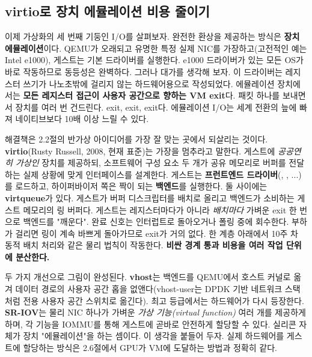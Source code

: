 \subsection*{virtio로 장치 에뮬레이션 비용 줄이기}

이제 가상화의 세 번째 기둥인 I/O를 살펴보자. 완전한 환상을 제공하는 방식은 \textbf{장치 에뮬레이션}이다. QEMU가 오래되고 유명한 특정 실제 NIC를 가장하고(고전적인 예는 Intel e1000), 게스트는 기본 드라이버를 실행한다. e1000 드라이버가 있는 모든 OS가 바로 작동하므로 동등성은 완벽하다. 그러나 대가를 생각해 보자. 이 드라이버는 레지스터 쓰기가 나노초밖에 걸리지 않는 하드웨어용으로 작성되었다. 에뮬레이션 장치에서는 \textbf{모든 레지스터 접근이 사용자 공간으로 향하는 VM exit}다. 패킷 하나를 보내면서 장치를 여러 번 건드린다. exit, exit, exit다. 에뮬레이션 I/O는 세계 전환의 늪에 빠져 네이티브보다 10배 이상 느릴 수 있다.

해결책은 2.2절의 반가상 아이디어를 가장 잘 맞는 곳에서 되살리는 것이다. \textbf{virtio}(Rusty Russell, 2008, 현재 표준)는 가장을 멈추라고 말한다. 게스트에 \textit{공공연히 가상인} 장치를 제공하되, 소프트웨어 구성 요소 두 개가 공유 메모리로 버퍼를 전달하는 실제 상황에 맞게 인터페이스를 설계한다. 게스트는 \textbf{프런트엔드 드라이버}(, , ...)를 로드하고, 하이퍼바이저 쪽은 짝이 되는 \textbf{백엔드}를 실행한다. 둘 사이에는 \textbf{virtqueue}가 있다. 게스트가 버퍼 디스크립터를 배치로 올리고 백엔드가 소비하는 게스트 메모리의 링 버퍼다. 게스트는 레지스터마다가 아니라 \textit{배치마다} 가벼운 exit 한 번으로 백엔드를 "깨운다". 완료 신호는 인터럽트로 돌아오거나 폴링 중에 회수한다. 부하가 걸리면 링이 계속 바쁘게 돌아가므로 exit가 거의 없다. 한 계층 아래에서 10주 차 동적 배치 처리와 같은 물리 법칙이 작동한다. \textbf{비싼 경계 통과 비용을 여러 작업 단위에 분산한다.}

두 가지 개선으로 그림이 완성된다. \textbf{vhost}는 백엔드를 QEMU에서 호스트 커널로 옮겨 데이터 경로의 사용자 공간 홉을 없앤다(vhost-user는 DPDK 기반 네트워크 스택처럼 전용 사용자 공간 스위치로 옮긴다). 최고 등급에서는 하드웨어가 다시 등장한다. \textbf{SR-IOV}는 물리 NIC 하나가 가벼운 \textit{가상 기능(virtual function)} 여러 개를 제공하게 하며, 각 기능을 IOMMU를 통해 게스트에 곧바로 안전하게 할당할 수 있다. 실리콘 자체가 장치 "에뮬레이션"을 하는 셈이다. 이 생각을 붙들어 두자. 실제 하드웨어를 게스트에 할당하는 방식은 2.6절에서 GPU가 VM에 도달하는 방법과 정확히 같다.

